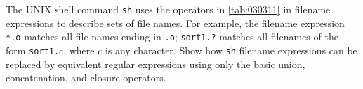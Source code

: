 \begin{exercise}\label{ex:030311}
    The UNIX shell command \texttt{sh} uses the operators in \autoref{tab:030311}
    in filename expressions to describe sets of file names. For example, the 
    filename expression \texttt{*.o} matches all file names ending in \texttt{.o}; 
    \texttt{sort1.?} matches all filenames of the form \texttt{sort1.}$c$, where 
    $c$ is any character. Show how \texttt{sh} filename expressions can be 
    replaced by equivalent regular expressions using only the basic union, 
    concatenation, and closure operators.
    
\end{exercise}